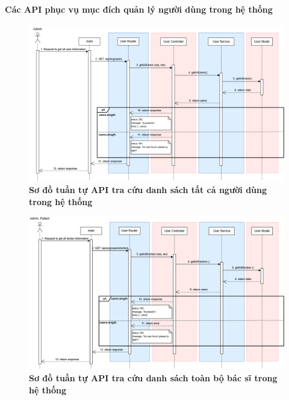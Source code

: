 \paragraph{Các API phục vụ mục đích quản lý người dùng trong hệ thống}
\mbox{}
\begin{figure}[H]
	\centering
	\includegraphics[width=16cm]{Images/api_sequence/user/getAllUsers.drawio.png}
	\caption[Sơ đồ tuần tự API tra cứu danh sách tất cả người dùng trong hệ thống]{\bfseries \fontsize{12pt}{0pt}\selectfont Sơ đồ tuần tự API tra cứu danh sách tất cả người dùng trong hệ thống}
	\label{sequence_diagram_get_all_users}
\end{figure}

\begin{figure}[H]
	\centering
	\includegraphics[width=16cm]{Images/api_sequence/user/getAllDoctors.drawio.png}
	\caption[Sơ đồ tuần tự API tra cứu danh sách toàn bộ bác sĩ trong hệ thống]{\bfseries \fontsize{12pt}{0pt}\selectfont Sơ đồ tuần tự API tra cứu danh sách toàn bộ bác sĩ trong hệ thống}
	\label{sequence_diagram_get_all_doctors}
\end{figure}

